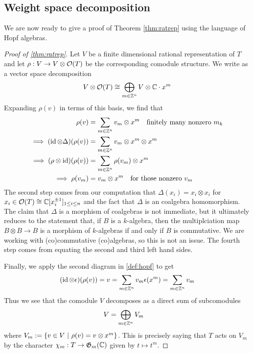 \documentclass[12pt]{article}
\begin{document}
\subsection{Weight space decomposition}
We are now ready to give a proof of Theorem \ref{thm:ratrep} using the language of Hopf algebras.
\begin{proof}
    [Proof of \ref{thm:ratrep}] Let $V$ be a finite dimensional rational representation of $T$ 
    and let $\rho: V\to V\otimes \mathcal{O}(T)$ be the corresponding comodule structure. We write as a vector space 
    decomposition \begin{align*}
        V \otimes \mathcal{O}(T) \cong \bigoplus_{m\in\mathbb{Z}^n} V\otimes \mathbb{C}\cdot x^m
    \end{align*} Expanding $\rho(v)$ in terms of this basis, we find that \begin{align*}
        \rho(v) &= \sum_{m\in\mathbb{Z}^n} v_m\otimes x^m \text{\quad finitely many nonzero $m_k$} \\
        \implies (\operatorname{id} \otimes \Delta)(\rho(v)) &= \sum_{m\in\mathbb{Z}^n} v_m\otimes x^m\otimes x^m \\
        \implies (\rho\otimes \operatorname{id})(\rho(v)) &= \sum_{m\in\mathbb{Z}^n} \rho(v_m)\otimes x^m \\
        \implies \rho(v_m) &= v_m\otimes x^m \text{\quad for those nonzero $v_m$}
    \end{align*} The second step comes from our computation that $\Delta(x_i) = x_i\otimes x_i$ for $x_i\in {\mathcal{O}}(T) \cong \mathbb{C}[x_i^{\pm 1}]_{1\leq i \leq n}$
    and the fact that $\Delta$ is an coalgebra homomorphism. The claim that $\Delta$ is a 
    morphism of coalgebras is not immediate, but it ultimately reduces to the statement that, if $B$ is
    a $k$-algebra, then the multiplciation map $B\otimes B\to B$ is a morphism of $k$-algebras if and only if $B$ is commutative.
    We are working with (co)commutative (co)algebras, so this is not an issue. The fourth step comes from equating the second and third left hand sides.

    \hfill 

    Finally, we apply the second diagram in \ref{def:hopf} to get \begin{align*}
        (\operatorname{id}\otimes \epsilon)(\rho(v)) = v = \sum_{m\in\mathbb{Z}^n} v_m\epsilon(x^m) = \sum_{m\in\mathbb{Z}^n} v_m
    \end{align*} Thus we see that the comodule $V$ decomposes as a direct sum of subcomodules \begin{align*}
        V &= \bigoplus_{m\in\mathbb{Z}^n} V_m
    \end{align*} where $V_m := \{v\in V \ \vert \  \rho(v) = v\otimes x^m\}$. This is precisely saying that $T$ acts on $V_m$ by the character $\chi_m: T\to \mathfrak{G}_m(\mathbb{C})$ given by $t\mapsto t^m$.
\end{proof}
\end{document}
